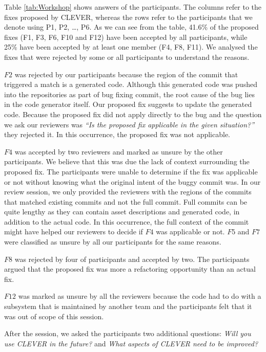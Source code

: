 \documentclass[sigconf]{acmart}
\begin{document}
Table \ref{tab:Workshop} shows answers of the participants. The columns
refer to the fixes proposed by CLEVER, whereas the rows refer to the
participants that we denote using P1, P2, \ldots{}, P6. As we can see
from the table, 41.6\% of the proposed fixes (F1, F3, F6, F10 and F12)
have been accepted by all participants, while 25\% have been accepted by
at least one member (F4, F8, F11). We analysed the fixes that were
rejected by some or all participants to understand the reasons.

\(F2\) was rejected by our participants because the region of the commit
that triggered a match is a generated code. Although this generated code
was pushed into the repositories as part of bug fixing commit, the root
cause of the bug lies in the code generator itself. Our proposed fix
suggests to update the generated code. Because the proposed fix did not
apply directly to the bug and the question we ask our reviewers was
\emph{``Is the proposed fix applicable in the given situation?''} they
rejected it. In this occurrence, the proposed fix was not applicable.

\(F4\) was accepted by two reviewers and marked as unsure by the other
participants. We believe that this was due the lack of context
surrounding the proposed fix. The participants were unable to determine
if the fix was applicable or not without knowing what the original
intent of the buggy commit was. In our review session, we only provided
the reviewers with the regions of the commits that matched existing
commits and not the full commit. Full commits can be quite lengthy as
they can contain asset descriptions and generated code, in addition to
the actual code. In this occurrence, the full context of the commit
might have helped our reviewers to decide if \(F4\) was applicable or
not. \(F5\) and \(F7\) were classified as unsure by all our participants
for the same reasons.

\(F8\) was rejected by four of participants and accepted by two. The
participants argued that the proposed fix was more a refactoring
opportunity than an actual fix.

\(F12\) was marked as unsure by all the reviewers because the code had
to do with a subsystem that is maintained by another team and the
participants felt that it was out of scope of this session.

After the session, we asked the participants two additional questions:
\emph{Will you use CLEVER in the future?} and \emph{What aspects of
CLEVER need to be improved?}
\end{document}
